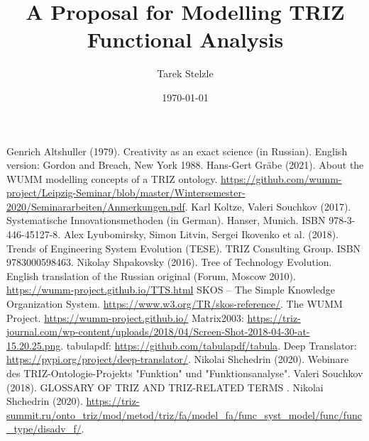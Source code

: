 \documentclass[11pt,a4paper]{article}
\title{A Proposal for Modelling TRIZ Functional Analysis}
\author{Tarek Stelzle}
\date{\today}
\begin{document}
\maketitle

\tableofcontents











\begin{thebibliography}{xxx}
\raggedright
{} Genrich Altshuller (1979).  Creativity as an exact
  science (in Russian). English version: Gordon and Breach, New York 1988.
 Hans-Gert Gr\"abe (2021). About the WUMM modelling
  concepts of a TRIZ ontology.  \url{https://github.com/wumm-project/Leipzig-Seminar/blob/master/Wintersemester-2020/Seminararbeiten/Anmerkungen.pdf}.
 Karl Koltze, Valeri Souchkov (2017).  Systematische
  Innovationsmethoden (in German).  Hanser, Munich. ISBN 978-3-446-45127-8.
 Alex Lyubomirsky, Simon Litvin, Sergei Ikovenko et al.
  (2018). Trends of Engineering System Evolution (TESE).  TRIZ Consulting
  Group. ISBN 9783000598463.
 Nikolay Shpakovsky (2016). Tree of Technology
  Evolution. English translation of the Russian original (Forum, Moscow
  2010).\\ \url{https://wumm-project.github.io/TTS.html}
 SKOS -- The Simple Knowledge Organization System.
  \url{https://www.w3.org/TR/skos-reference/}.  
 The WUMM Project. \url{https://wumm-project.github.io/} 
 Matrix2003: \url{https://triz-journal.com/wp-content/uploads/2018/04/Screen-Shot-2018-04-30-at-15.20.25.png}.
 tabulapdf: \url{https://github.com/tabulapdf/tabula}.
 Deep Translator: \url{https://pypi.org/project/deep-translator/}.
 Nikolai Shchedrin (2020). Webinare des TRIZ-Ontologie-Projekts "Funktion" und "Funktionsanalyse".
 Valeri Souchkov (2018). GLOSSARY OF TRIZ AND TRIZ-RELATED TERMS .
 Nikolai Shchedrin (2020). \url{https://triz-summit.ru/onto_triz/mod/metod/triz/fa/model_fa/func_syst_model/func/func_type/disadv_f/}.
\end{thebibliography}
\end{document}
